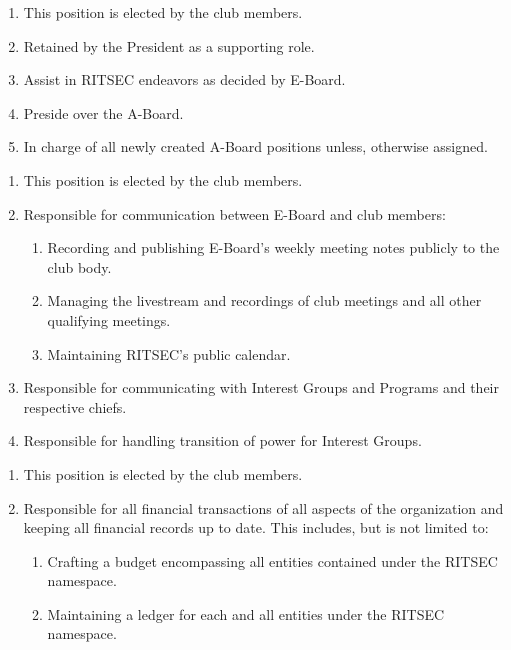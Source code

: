 
\begin{enumerate}
  \item This position is elected by the club members.
  \item Retained by the President as a supporting role.
  \item Assist in RITSEC endeavors as decided by E-Board.
  \item Preside over the A-Board.
  \item In charge of all newly created A-Board positions unless, otherwise assigned.
\end{enumerate}


\begin{enumerate}
  \item This position is elected by the club members.
  \item Responsible for communication between E-Board and club members:
  \begin{enumerate}
    \item Recording and publishing E-Board's weekly meeting notes publicly to the club body.
    \item Managing the livestream and recordings of club meetings and all other qualifying meetings. 
    \item Maintaining RITSEC's public calendar.
  \end{enumerate}
  \item Responsible for communicating with Interest Groups and Programs and their respective chiefs.
  \item Responsible for handling transition of power for Interest Groups.
\end{enumerate}


\begin{enumerate}
  \item This position is elected by the club members.
  \item Responsible for all financial transactions of all aspects of the organization and keeping all financial records up to date. This includes, but is not limited to:
  \begin{enumerate} 
    \item Crafting a budget encompassing all entities contained under the RITSEC namespace.
    \item Maintaining a ledger for each and all entities under the RITSEC namespace.
  \end{enumerate}
\end{enumerate}


